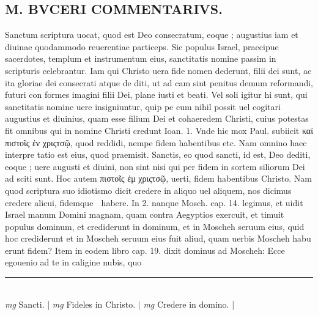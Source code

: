 \documentclass{article}
\begin{document}
\begin{pages}
\section*{M. BVCERI COMMENTARIVS.  }
\marginpar{[ p.19 ]}\pstart Sanctum scriptura uocat, quod est Deo consecratum, eoque ; augustius iam et diuinae quodammodo reuerentiae particeps.  Sic populus Israel, praecipue sacerdotes, templum et instrumentum eius, sanctitatis nomine passim in scripturis celebrantur.  Iam qui Christo uera fide nomen dederunt, filii dei sunt, ac ita gloriae dei consecrati atque  de diti, ut ad cam sint penitus demum reformandi, futuri con formes imagini filii Dei, plane iusti et beati.  Vel soli igitur hi sunt, qui sanctitatis nomine uere insigniuntur, quip pe cum nihil possit uel cogitari augustius et diuinius, quam esse filium Dei et cohaeredem Christi, cuius potestas fit omnibus qui in nomine Christi credunt Ioan. 1.  Vnde hic mox Paul.  subiicit καί πιστοῖς ἐν χριςτσῷ, quod reddidi, nempe fidem habentibus etc. Nam omnino haec interpre tatio est eius, quod praemisit. Sanctis, eo quod sancti, id est, Deo dediti, eoque ; uere augusti et diuini, non sint nisi qui per fidem in sortem siliorum Dei ad sciti sunt.  \pend\pstart Hoc autem πιστοῖς ἐμ χριςτσῷ, uerti, fidem habentibus Christo.  Nam quod scriptura suo idiotismo dicit credere in aliquo uel aliquem, nos dicimus credere alicui, fidemque  habere.  In 2.  nanque Mosch.  cap. 14. legimus, et uidit Israel manum Domini magnam, quam contra Aegyptios exercuit, et timuit populus dominum, et crediderunt in dominum, et in Moscheh seruum eius, quid hoc crediderunt et in Moscheh seruum eius fuit aliud, quam uerbis Moscheh habu erunt fidem? Item in eodem libro cap. 19. dixit dominus ad Moscheh: Ecce egouenio ad te in caligine nubis, quo  \pend
\vspace{0.5cm}\noindent
\vspace{0.2cm}\rule{1cm}{0.2pt}\\ 
\hspace{0.2cm}\textit{mg}
\footnotesize Sancti. 
\normalsize| 
\hspace{0.2cm}\textit{mg}
\footnotesize Fideles in Christo. 
\normalsize| 
\hspace{0.2cm}\textit{mg}
\footnotesize Credere in domino. 
\normalsize| 

\end{pages}
\end{document}
